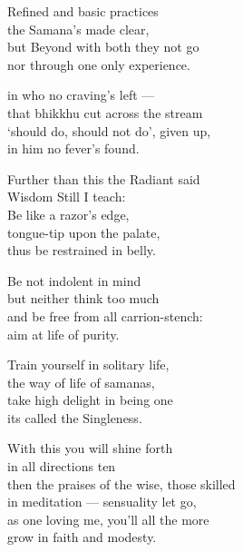 \begin{MyDescription}{}
Refined and basic practices\\
the Samana's made clear,\\
but Beyond with both they not go\\
nor through one only experience.
\end{MyDescription} 

\begin{MyDescription}{}
in who no craving's left —\\
that bhikkhu cut across the stream\\
`should do, should not do', given up,\\
in him no fever's found.
\end{MyDescription} 

\begin{MyDescription}{}
Further than this the Radiant said\\
Wisdom Still I teach:\\
Be like a razor's edge,\\
tongue-tip upon the palate,\\
thus be restrained in belly.
\end{MyDescription} 

\begin{MyDescription}{}

Be not indolent in mind\\
but neither think too much\\
and be free from all carrion-stench:\\
aim at life of purity.
\end{MyDescription} 

\begin{MyDescription}{}
Train yourself in solitary life,\\
the way of life of samanas,\\
take high delight in being one\\
its called the Singleness.
\end{MyDescription} 

\begin{MyDescription}{}
With this you will shine forth\\
in all directions ten\\
then the praises of the wise, those skilled\\
in meditation — sensuality let go,\\
as one loving me, you'll all the more\\
grow in faith and modesty.
\end{MyDescription} 


